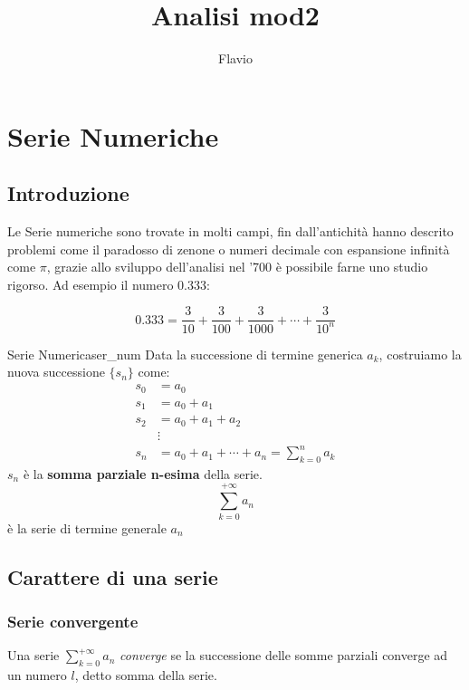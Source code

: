 \documentclass{memoir}
\title{Analisi mod2}
\author{Flavio}
\begin{document}
\maketitle

\chapter{Serie Numeriche}
\section{Introduzione}

Le Serie numeriche sono trovate in molti campi, fin dall'antichità hanno descrito problemi come il paradosso di zenone o numeri decimale con espansione infinità come \(\pi \), grazie allo sviluppo dell'analisi nel '700 è possibile farne uno studio rigorso. Ad esempio il numero 0.333:

\[0.333 = \frac{3}{10} + \frac{3}{100} + \frac{3}{1000} + \cdots + \frac{3}{10^n}
\]
\begin{deff}{Serie Numerica}{ser_num}
  Data la successione di termine generica \(a_k\), costruiamo la nuova successione \(\{s_n\}\) come:
\begin{align*}
s_0 &= a_0\\
s_1 &= a_0 + a_1\\
s_2 &= a_0 + a_1 + a_2\\
      &\vdots \\
  s_n &= a_0 + a_1 + \cdots + a_n = \sum_{k=0}^n a_k
\end{align*}
\(s_n\) è la \textbf{somma parziale n-esima} della serie.
\[
  \sum_{k=0}^{+\infty} a_n\] è la serie di termine generale \(a_n\)
\end{deff}
\section{Carattere di una serie}

\subsection{Serie convergente}
Una serie \(\sum_{k=0}^{+\infty} a_n \) \textit{converge} se la successione delle somme parziali converge ad un numero \(l\), detto somma della serie.
\end{document}
